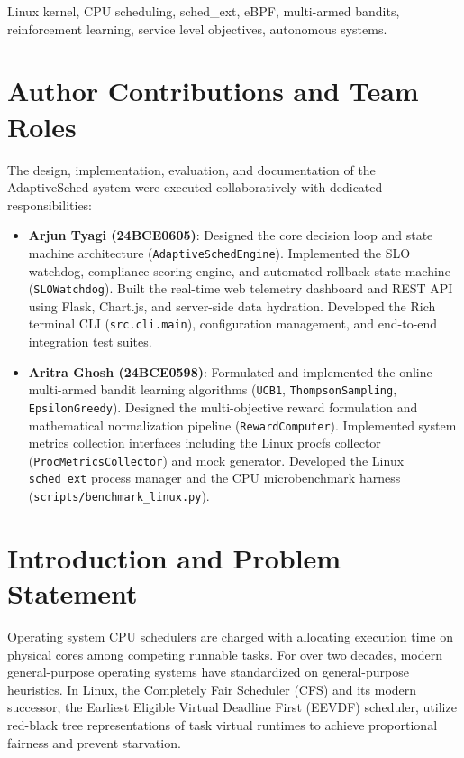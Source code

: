 \documentclass[journal]{IEEEtran}
\begin{document}
\begin{IEEEkeywords}
Linux kernel, CPU scheduling, sched\_ext, eBPF, multi-armed bandits, reinforcement learning, service level objectives, autonomous systems.
\end{IEEEkeywords}

\section*{Author Contributions and Team Roles}
The design, implementation, evaluation, and documentation of the AdaptiveSched system were executed collaboratively with dedicated responsibilities:
\begin{itemize}
    \item \textbf{Arjun Tyagi (24BCE0605)}: Designed the core decision loop and state machine architecture (\texttt{AdaptiveSchedEngine}). Implemented the SLO watchdog, compliance scoring engine, and automated rollback state machine (\texttt{SLOWatchdog}). Built the real-time web telemetry dashboard and REST API using Flask, Chart.js, and server-side data hydration. Developed the Rich terminal CLI (\texttt{src.cli.main}), configuration management, and end-to-end integration test suites.
    \item \textbf{Aritra Ghosh (24BCE0598)}: Formulated and implemented the online multi-armed bandit learning algorithms (\texttt{UCB1}, \texttt{ThompsonSampling}, \texttt{EpsilonGreedy}). Designed the multi-objective reward formulation and mathematical normalization pipeline (\texttt{RewardComputer}). Implemented system metrics collection interfaces including the Linux procfs collector (\texttt{ProcMetricsCollector}) and mock generator. Developed the Linux \texttt{sched\_ext} process manager and the CPU microbenchmark harness (\texttt{scripts/benchmark\_linux.py}).
\end{itemize}

\section{Introduction and Problem Statement}
\label{sec:intro}

Operating system CPU schedulers are charged with allocating execution time on physical cores among competing runnable tasks. For over two decades, modern general-purpose operating systems have standardized on general-purpose heuristics. In Linux, the Completely Fair Scheduler (CFS) and its modern successor, the Earliest Eligible Virtual Deadline First (EEVDF) scheduler, utilize red-black tree representations of task virtual runtimes to achieve proportional fairness and prevent starvation.
\end{document}

